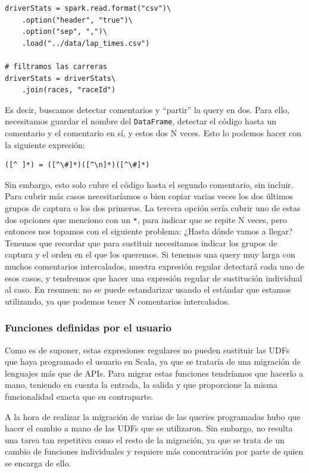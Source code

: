 \documentclass[12pt,twoside,titlepage]{report}
\newcommand{\quotes}[1]{``#1''}
\begin{document}
\begin{lstlisting}
driverStats = spark.read.format("csv")\
	.option("header", "true")\
	.option("sep", ",")\
	.load("../data/lap_times.csv")
	
# filtramos las carreras
driverStats = driverStats\
	.join(races, "raceId")
\end{lstlisting}

Es decir, buscamos detectar comentarios y \quotes{partir} la query en dos. Para ello, necesitamos guardar el nombre del \texttt{DataFrame}, detectar el código hasta un comentario y el comentario en sí, y estos dos N veces. Esto lo podemos hacer con la siguiente expresión:

\begin{lstlisting}
([^ ]*) = ([^\#]*)([^\n]*)([^\#]*)
\end{lstlisting}

Sin embargo, esto solo cubre el código hasta el segundo comentario, sin incluir. Para cubrir más casos necesitaríamos o bien copiar varias veces los dos últimos grupos de captura o los dos primeros. La tercera opción sería cubrir uno de estas dos opciones que menciono con un \texttt{*}, para indicar que se repite N veces, pero entonces nos topamos con el siguiente problema: ¿Hasta dónde vamos a llegar? Tenemos que recordar que para sustituir necesitamos indicar los grupos de captura y el orden en el que los queremos. Si tenemos una query muy larga con muchos comentarios intercalados, nuestra expresión regular detectará cada uno de esos casos, y tendremos que hacer una expresión regular de sustitución individual al caso. En resumen: no se puede estandarizar usando el estándar que estamos utilizando, ya que podemos tener N comentarios intercalados.

\subsubsection{Funciones definidas por el usuario}

Como es de suponer, estas expresiones regulares no pueden sustituir las UDFs que haya programado el usuario en Scala, ya que se trataría de una migración de lenguajes más que de APIs. Para migrar estas funciones tendríamos que hacerlo a mano, teniendo en cuenta la entrada, la salida y que proporcione la misma funcionalidad exacta que su contraparte. 

A la hora de realizar la migración de varias de las queries programadas hubo que hacer el cambio a mano de las UDFs que se utilizaron. Sin embargo, no resulta una tarea tan repetitiva como el resto de la migración, ya que se trata de un cambio de funciones individuales y requiere más concentración por parte de quien se encarga de ello.
\end{document}
